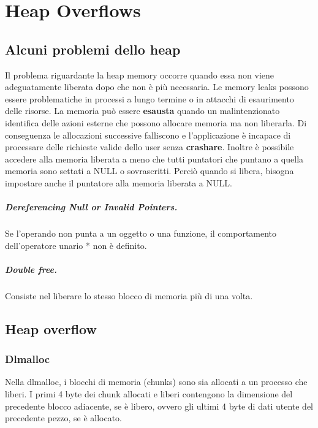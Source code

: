 \chapter{Heap Overflows}

\section{Alcuni problemi dello heap}

Il problema riguardante la heap memory occorre quando essa non viene adeguatamente
liberata dopo che non è più necessaria. Le memory leaks possono essere problematiche
in processi a lungo termine
o in attacchi di esaurimento delle risorse. La memoria può
essere \textbf{esausta} quando un malintenzionato identifica delle azioni esterne
che possono allocare memoria ma non liberarla. Di conseguenza le allocazioni successive
falliscono e l'applicazione è incapace di processare delle richieste valide dello user
senza \textbf{crashare}. Inoltre è possibile accedere alla memoria liberata a meno
che tutti puntatori che puntano a quella memoria sono settati a NULL o sovrascritti.
Perciò quando si libera, bisogna impostare anche il puntatore alla memoria liberata
a NULL.

\paragraph{Dereferencing Null or Invalid Pointers.} Se l'operando non punta a un
oggetto o una funzione, il comportamento dell'operatore unario * non è definito.

\paragraph{Double free.} Consiste nel liberare lo stesso blocco di memoria più di una volta.

\section{Heap overflow}

\subsection{Dlmalloc}

Nella dlmalloc, i blocchi di memoria (chunks) sono sia allocati a un processo che liberi.
I primi 4 byte dei chunk allocati e liberi contengono la dimensione del precedente
blocco adiacente, se è libero, ovvero gli ultimi 4 byte di dati utente del
precedente pezzo, se è allocato.


